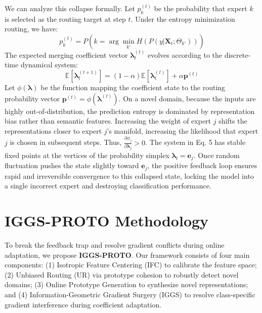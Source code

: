 \documentclass{article}
\theoremstyle{plain}
\theoremstyle{definition}
\theoremstyle{remark}
\begin{document}
We can analyze this collapse formally. Let $p_k^{(t)}$ be the probability that expert $k$ is selected as the routing target at step $t$. Under the entropy minimization routing, we have:
\begin{equation}
    p_k^{(t)} = P\left( k = \arg\min_{k'} H\left(P\left(y | \mathbf{X}_t; \Theta_{k'}\right)\right) \right)
\end{equation}
The expected merging coefficient vector $\boldsymbol{\lambda}_l^{(t)}$ evolves according to the discrete-time dynamical system:
\begin{equation}
    \mathbb{E}\left[\boldsymbol{\lambda}_l^{(t+1)}\right] = (1 - \alpha) \mathbb{E}\left[\boldsymbol{\lambda}_l^{(t)}\right] + \alpha \mathbf{p}^{(t)}
\end{equation}
Let $\phi(\boldsymbol{\lambda})$ be the function mapping the coefficient state to the routing probability vector $\mathbf{p}^{(t)} = \phi(\boldsymbol{\lambda}^{(t)})$. On a novel domain, because the inputs are highly out-of-distribution, the prediction entropy is dominated by representation bias rather than semantic features. Increasing the weight of expert $j$ shifts the representations closer to expert $j$'s manifold, increasing the likelihood that expert $j$ is chosen in subsequent steps. Thus, $\frac{\partial \phi_j}{\partial \boldsymbol{\lambda}_j} > 0$. The system in Eq. 5 has stable fixed points at the vertices of the probability simplex $\boldsymbol{\lambda}_l = \mathbf{e}_j$. Once random fluctuation pushes the state slightly toward $\mathbf{e}_j$, the positive feedback loop ensures rapid and irreversible convergence to this collapsed state, locking the model into a single incorrect expert and destroying classification performance.

\section{IGGS-PROTO Methodology}
\label{submission-sec4}
To break the feedback trap and resolve gradient conflicts during online adaptation, we propose \textbf{IGGS-PROTO}. Our framework consists of four main components: (1) Isotropic Feature Centering (IFC) to calibrate the feature space; (2) Unbiased Routing (UR) via prototype cohesion to robustly detect novel domains; (3) Online Prototype Generation to synthesize novel representations; and (4) Information-Geometric Gradient Surgery (IGGS) to resolve class-specific gradient interference during coefficient adaptation.
\end{document}
